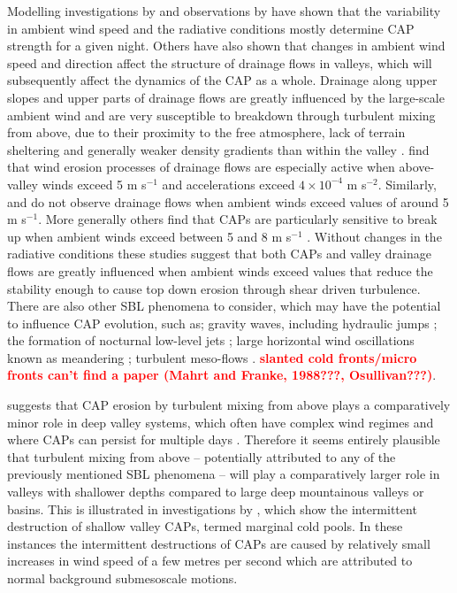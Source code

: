 \documentclass[times]{qjrms4}
\begin{document}
Modelling investigations by \citet{vosper2008numerical} and observations by \citet{sheridan2013characteristics} have shown that the variability in ambient wind speed and the radiative conditions mostly determine CAP strength for a given night. Others have also shown that changes in ambient wind speed \citep{orgill1992mesoscale} and direction \citep{coulter1989} affect the structure of drainage flows in valleys, which will subsequently affect the dynamics of the CAP as a whole. Drainage along upper slopes and upper parts of drainage flows are greatly influenced by the large-scale ambient wind and are very susceptible to breakdown through turbulent mixing from above, due to their proximity to the free atmosphere, lack of terrain sheltering and generally weaker density gradients than within the valley \citep{barr1989influence,gudiksen1992measurements}. \citet{orgill1992mesoscale} find that wind erosion processes of drainage flows are especially active when above-valley winds exceed 5 m s$^{-1}$ and accelerations exceed $4\times10^{-4}$ m s$^{-2}$. Similarly, \citet{heywood1933katabatic} and \citet{gudiksen1992measurements} do not observe drainage flows when ambient winds exceed values of around 5 m s$^{-1}$. More generally others find that CAPs are particularly sensitive to break up when ambient winds exceed between 5 and 8 m s$^{-1}$ \citep{barr1989influence,iijima2000seasonal}. Without changes in the radiative conditions these studies suggest that both CAPs and valley drainage flows are greatly influenced when ambient winds exceed values that reduce the stability enough to cause top down erosion through shear driven turbulence. There are also other SBL phenomena to consider, which may have the potential to influence CAP evolution, such as; gravity waves, including hydraulic jumps \citep{adler2012warm}; the formation of nocturnal low-level jets \citep[NLLJs]{thorpe1977nocturnal}; large horizontal wind oscillations known as meandering \citep{orgill1992mesoscale}; turbulent meso-flows \citep{parker1993case}. \textcolor{red}{\bf slanted cold fronts/micro fronts can't find a paper (Mahrt and Franke, 1988???, Osullivan???)}.

\citet{zangl2005dynamical} suggests that CAP erosion by turbulent mixing from above plays a comparatively minor role in deep valley systems, which often have complex wind regimes and where CAPs can persist for multiple days \citep{whiteman2001cold}. Therefore it seems entirely plausible that turbulent mixing from above -- potentially attributed to any of the previously mentioned SBL phenomena -- will play a comparatively larger role in valleys with shallower depths compared to large deep mountainous valleys or basins. This is illustrated in investigations by \citet{mahrt2015common}, which show the intermittent destruction of shallow valley CAPs, termed marginal cold pools. In these instances the intermittent destructions of CAPs are caused by relatively small increases in wind speed of a few metres per second which are attributed to normal background submesoscale motions.
\end{document}
